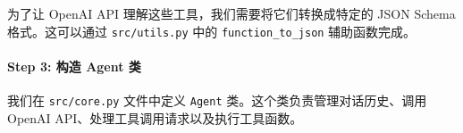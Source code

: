\documentclass[12pt,a4paper]{book}
\begin{document}
为了让 OpenAI API 理解这些工具，我们需要将它们转换成特定的 JSON Schema
格式。这可以通过 \texttt{src/utils.py} 中的 \texttt{function\_to\_json}
辅助函数完成。

\begin{Shaded}
\begin{Highlighting}[]

\OperatorTok{{-}\textgreater{}} \NormalTok{:}
    \NormalTok{ \{}
        \NormalTok{: }\NormalTok{,}
        \NormalTok{: \{}
            \NormalTok{,}
            \NormalTok{: \{}
                \NormalTok{: }\NormalTok{,}
\NormalTok{            \},}
\NormalTok{        \},}
\NormalTok{    \}}
\end{Highlighting}
\end{Shaded}

\paragraph{Step 3: 构造 Agent
类}\label{step-3-ux6784ux9020-agent-ux7c7b}

我们在 \texttt{src/core.py} 文件中定义 \texttt{Agent}
类。这个类负责管理对话历史、调用 OpenAI
API、处理工具调用请求以及执行工具函数。
\end{document}

